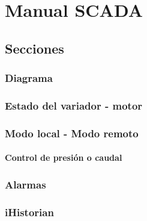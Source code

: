 \section{Manual SCADA}
\subsection{Secciones}
\subsubsection{Diagrama}
\subsubsection{Estado del variador - motor}
\subsubsection{Modo local - Modo remoto}
\paragraph{Control de presión o caudal}
\subsubsection{Alarmas}
\subsubsection{iHistorian}




\newpage